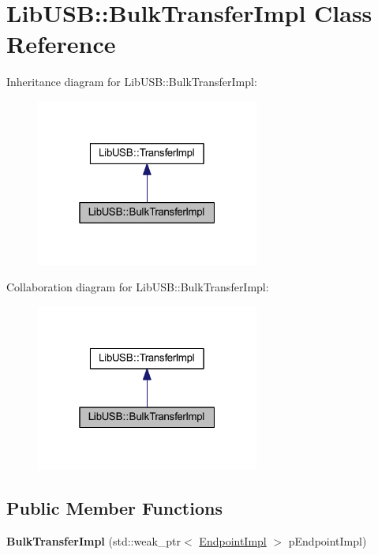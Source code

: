 \hypertarget{class_lib_u_s_b_1_1_bulk_transfer_impl}{\section{Lib\-U\-S\-B\-:\-:Bulk\-Transfer\-Impl Class Reference}
\label{class_lib_u_s_b_1_1_bulk_transfer_impl}
}


Inheritance diagram for Lib\-U\-S\-B\-:\-:Bulk\-Transfer\-Impl\-:
\nopagebreak
\begin{figure}[H]
\begin{center}
\leavevmode
\includegraphics[width=208pt]{class_lib_u_s_b_1_1_bulk_transfer_impl__inherit__graph}
\end{center}
\end{figure}


Collaboration diagram for Lib\-U\-S\-B\-:\-:Bulk\-Transfer\-Impl\-:
\nopagebreak
\begin{figure}[H]
\begin{center}
\leavevmode
\includegraphics[width=208pt]{class_lib_u_s_b_1_1_bulk_transfer_impl__coll__graph}
\end{center}
\end{figure}
\subsection*{Public Member Functions}
\begin{DoxyCompactItemize}
\item 
\hypertarget{class_lib_u_s_b_1_1_bulk_transfer_impl_a15ec6945f435526578b91273aa239de1}{{\bfseries Bulk\-Transfer\-Impl} (std\-::weak\-\_\-ptr$<$ \hyperlink{class_lib_u_s_b_1_1_endpoint_impl}{Endpoint\-Impl} $>$ p\-Endpoint\-Impl)}\label{class_lib_u_s_b_1_1_bulk_transfer_impl_a15ec6945f435526578b91273aa239de1}

\end{DoxyCompactItemize}
